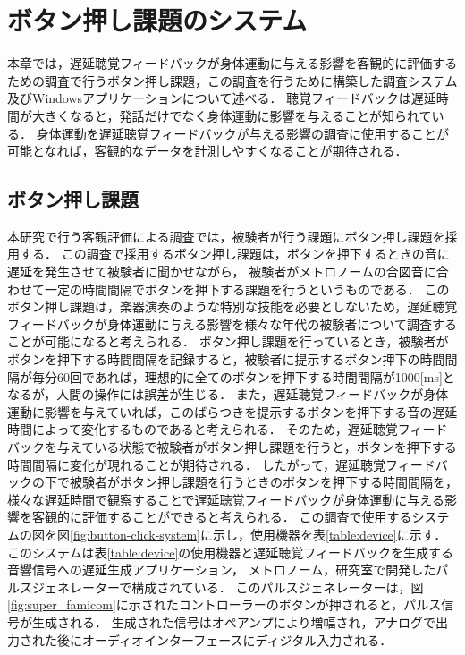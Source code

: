 \chapter{ボタン押し課題のシステム}
本章では，遅延聴覚フィードバックが身体運動に与える影響を客観的に評価するための調査で行うボタン押し課題，この調査を行うために構築した調査システム及びWindowsアプリケーションについて述べる．
聴覚フィードバックは遅延時間が大きくなると，発話だけでなく身体運動に影響を与えることが知られている\cite{timing-music}\cite{shimada-DAF}．
身体運動を遅延聴覚フィードバックが与える影響の調査に使用することが可能となれば，客観的なデータを計測しやすくなることが期待される．

\section{ボタン押し課題}
本研究で行う客観評価による調査では，被験者が行う課題にボタン押し課題を採用する．
この調査で採用するボタン押し課題は，ボタンを押下するときの音に遅延を発生させて被験者に聞かせながら，
被験者がメトロノームの合図音に合わせて一定の時間間隔でボタンを押下する課題を行うというものである．
このボタン押し課題は，楽器演奏のような特別な技能を必要としないため，遅延聴覚フィードバックが身体運動に与える影響を様々な年代の被験者について調査することが可能になると考えられる．
ボタン押し課題を行っているとき，被験者がボタンを押下する時間間隔を記録すると，被験者に提示するボタン押下の時間間隔が毎分60回であれば，理想的に全てのボタンを押下する時間間隔が1000[ms]となるが，人間の操作には誤差が生じる．
また，遅延聴覚フィードバックが身体運動に影響を与えていれば，このばらつきを提示するボタンを押下する音の遅延時間によって変化するものであると考えられる．
そのため，遅延聴覚フィードバックを与えている状態で被験者がボタン押し課題を行うと，ボタンを押下する時間間隔に変化が現れることが期待される．
したがって，遅延聴覚フィードバックの下で被験者がボタン押し課題を行うときのボタンを押下する時間間隔を，
様々な遅延時間で観察することで遅延聴覚フィードバックが身体運動に与える影響を客観的に評価することができると考えられる．
この調査で使用するシステムの図を図\ref{fig:button-click-system}に示し，使用機器を表\ref{table:device}に示す．
このシステムは表\ref{table:device}の使用機器と遅延聴覚フィードバックを生成する音響信号への遅延生成アプリケーション，
メトロノーム，研究室で開発したパルスジェネレーターで構成されている．
このパルスジェネレーターは，図\ref{fig:super_famicom}に示されたコントローラーのボタンが押されると，パルス信号が生成される．
生成された信号はオペアンプにより増幅され，アナログで出力された後にオーディオインターフェースにディジタル入力される．

